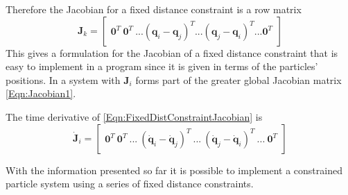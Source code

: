 Therefore the Jacobian for a fixed distance constraint is a row matrix
\begin{equation}
    \label{Eqn:FixedDistConstraintJacobian}
    \mathbf{J}_k = 
    \begin{bmatrix}
        \mathbf{0}^T \: \mathbf{0}^T \: ... \left(\mathbf{q}_i -
        \mathbf{q}_j\right)^T 
        ... \left(\mathbf{q}_j - \mathbf{q}_i\right)^T ... \mathbf{0}^T 
    \end{bmatrix}
\end{equation}
This gives a formulation for the Jacobian of a fixed distance constraint that
is easy to implement in a program since it is given in terms of the particles'
positions. In a system with $\mathbf{J}_i$ forms part of the greater global
Jacobian matrix \ref{Eqn:Jacobian1}.

The time derivative of \ref{Eqn:FixedDistConstraintJacobian} is 
\begin{equation}    
    \dot{\mathbf{J}}_i =    
    \begin{bmatrix}
        \mathbf{0}^T \: \mathbf{0}^T \: ... \: \left(\dot{\mathbf{q}}_i -
        \dot{\mathbf{q}}_j\right)^T \: 
        ... \: \left(\dot{\mathbf{q}}_j - \dot{\mathbf{q}}_i\right)^T \: ... \:
        \mathbf{0}^T 
    \end{bmatrix}   
\end{equation}

With the information presented so far it is possible to implement a constrained
particle system using a series of fixed distance constraints.

